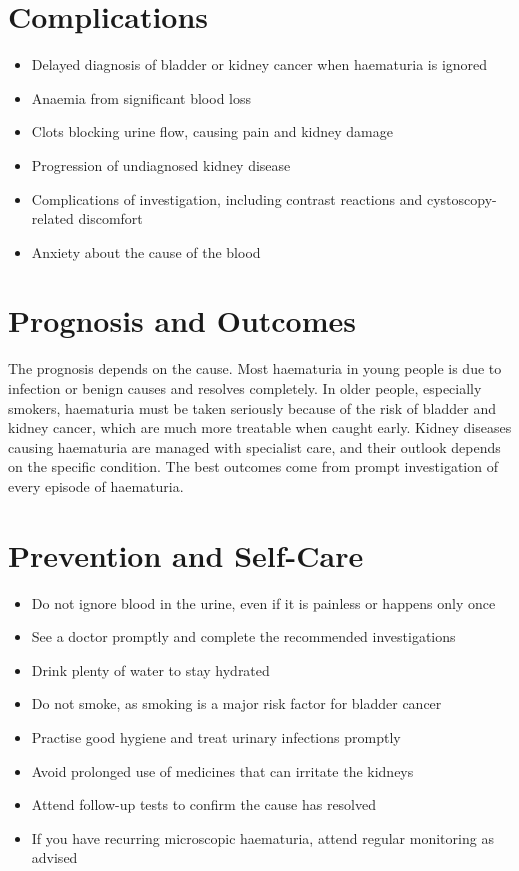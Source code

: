 \section*{Complications}
\begin{itemize}
    \item Delayed diagnosis of bladder or kidney cancer when haematuria is ignored
    \item Anaemia from significant blood loss
    \item Clots blocking urine flow, causing pain and kidney damage
    \item Progression of undiagnosed kidney disease
    \item Complications of investigation, including contrast reactions and cystoscopy-related discomfort
    \item Anxiety about the cause of the blood
\end{itemize}

\section*{Prognosis and Outcomes}
The prognosis depends on the cause. Most haematuria in young people is due to infection or benign causes and resolves completely. In older people, especially smokers, haematuria must be taken seriously because of the risk of bladder and kidney cancer, which are much more treatable when caught early. Kidney diseases causing haematuria are managed with specialist care, and their outlook depends on the specific condition. The best outcomes come from prompt investigation of every episode of haematuria.

\section*{Prevention and Self-Care}
\begin{itemize}
    \item Do not ignore blood in the urine, even if it is painless or happens only once
    \item See a doctor promptly and complete the recommended investigations
    \item Drink plenty of water to stay hydrated
    \item Do not smoke, as smoking is a major risk factor for bladder cancer
    \item Practise good hygiene and treat urinary infections promptly
    \item Avoid prolonged use of medicines that can irritate the kidneys
    \item Attend follow-up tests to confirm the cause has resolved
    \item If you have recurring microscopic haematuria, attend regular monitoring as advised
\end{itemize}

